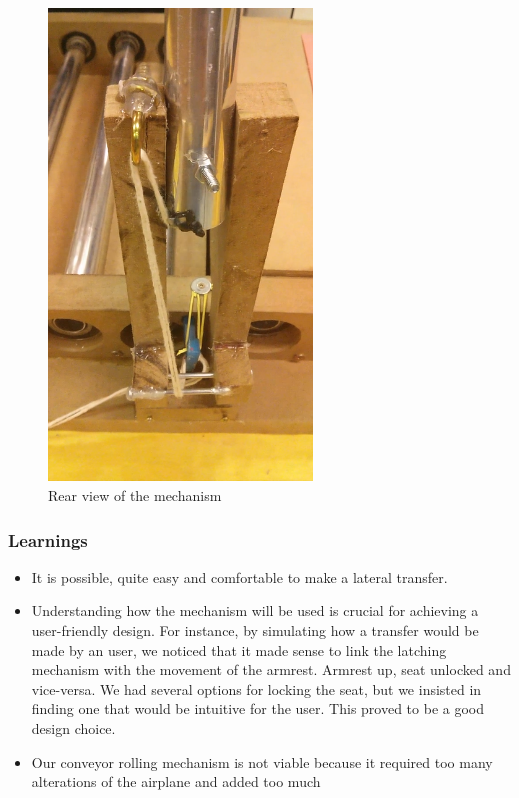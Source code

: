 \begin{figure}[h]
\centering
\includegraphics[width=7cm]{brazil_images/image053.png}
\caption{Rear view of the mechanism}
\label{fig:rear_view}
\end{figure}


\subsubsection{Learnings}

\begin{itemize}
	\item It is possible, quite easy and comfortable to make a lateral transfer.
	\item Understanding how the mechanism will be used is crucial for achieving a user-friendly design. For instance, by simulating how a transfer would be made by an user, we noticed that it made sense to link the latching mechanism with the movement of the armrest. Armrest up, seat unlocked and vice-versa. We had several options for locking the seat, but we insisted in finding one that would be intuitive for the user. This proved to be a good design choice.
	\item Our conveyor rolling mechanism is not viable because it required too many alterations of the airplane and added too much 
\end{itemize}


